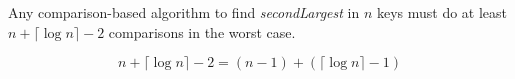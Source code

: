 
\begin{frame}{}
  \begin{theorem}
    Any comparison-based algorithm to find \textsl{secondLargest} in $n$ keys
    must do at least $n + \lceil \log n \rceil - 2$ comparisons in the worst case.
  \end{theorem}
\end{frame}

\begin{frame}{}
  \[
    n + \lceil \log n \rceil - 2 = (n-1) + (\lceil \log n \rceil - 1)
  \]

\end{frame}

